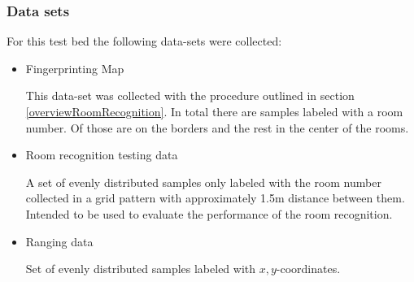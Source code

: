 \subsubsection{Data sets}
For this test bed the following data-sets were collected:
\begin{itemize}
\item Fingerprinting Map

This data-set was collected with the procedure outlined in section \ref{overviewRoomRecognition}. In total there are  samples labeled with a room number. Of those  are on the borders and the rest in the center of the rooms. 
\item Room recognition testing data

A set of evenly distributed samples only labeled with the room number collected in a grid pattern with approximately 1.5m distance between them. Intended to be used to evaluate the performance of the room recognition.

\item Ranging data

Set of  evenly distributed samples labeled with \(x,y\)-coordinates. 
\end{itemize}








